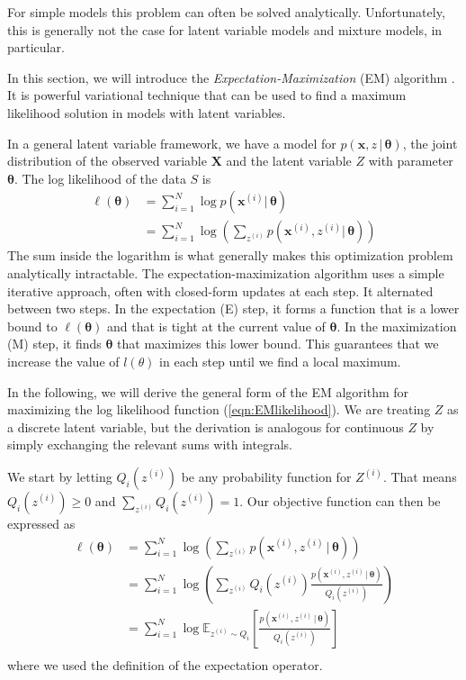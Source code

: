 \documentclass[final,3p,times,twocolumn]{elsarticle}
\let\bs\boldsymbol
\begin{document}
For simple models this problem can often be solved analytically.
Unfortunately, this is generally not the case for latent variable models and mixture models, in particular.

In this section, we will introduce the \emph{Expectation-Maximization} (EM) algorithm \cite{dempster1977}.
It is powerful variational technique that can be used to find a maximum likelihood solution in models with latent variables.

In a general latent variable framework, we have a model for $p(\bs x,z\,|\,\bs\theta)$, the joint distribution of the observed variable $\bs X$ and the latent variable $Z$ with parameter $\bs\theta$. 
The log likelihood of the data $S$ is 
\begin{equation}
\label{eqn:EMlikelihood}
\begin{split}
\ell(\bs\theta) &= \sum_{i=1}^N \log p(\bs x^{(i)}|\,\bs\theta)\\
&= \sum_{i=1}^N \log \left( \sum_{z^{(i)}} p(\bs x^{(i)},z^{(i)}|\,\bs\theta)\right)
\end{split}
\end{equation}
The sum inside the logarithm is what generally makes this optimization problem analytically intractable.
The expectation-maximization algorithm uses a simple iterative approach, often with closed-form updates at each step.
It alternated between two steps.
In the expectation (E) step, it forms a function that is a lower bound to $\ell(\bs\theta)$ and that is tight at the current value of $\bs\theta$.
In the maximization (M) step, it finds $\bs\theta$ that maximizes this lower bound.
This guarantees that we increase the value of $l(\theta)$ in each step until we find a local maximum.

In the following, we will derive the general form of the EM algorithm for maximizing the log likelihood function (\ref{eqn:EMlikelihood}).
We are treating $Z$ as a discrete latent variable, but the derivation is analogous for continuous $Z$ by simply exchanging the relevant sums with integrals.

We start by letting $Q_i(z^{(i)})$ be any probability function for $Z^{(i)}$. 
That means $Q_i(z^{(i)}) \geq 0$ and $\sum_{z^{(i)}} Q_i(z^{(i)}) = 1$. 
Our objective function can then be expressed as
\begin{equation}
\begin{split}
\ell(\bs\theta) &= \sum_{i=1}^N \log\left(\sum_{z^{(i)}} p(\bs x^{(i)},z^{(i)}\,|\,\bs\theta)\right)\\
&= \sum_{i=1}^N \log \left(\sum_{z^{(i)}} Q_i(z^{(i)}) \frac{p(\bs x^{(i)},z^{(i)}\,|\,\bs\theta)}{Q_i(z^{(i)})}\right)\\
&= \sum_{i=1}^N \log \mathbb{E}_{z^{(i)} \sim Q_i}\left[\frac{p(\bs x^{(i)},z^{(i)}\,|\,\bs\theta)}{Q_i(z^{(i)})}\right]\\
\end{split}
\end{equation}
where we used the definition of the expectation operator.
\end{document}
